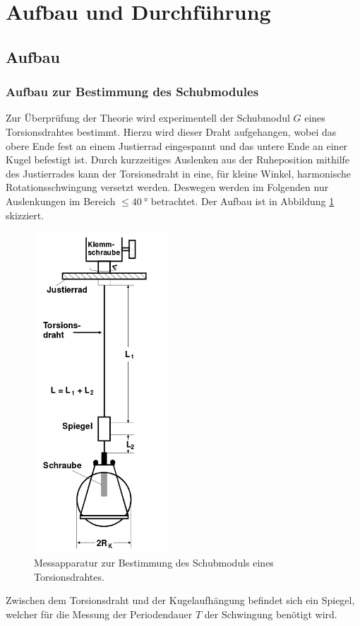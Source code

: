 \section{Aufbau und Durchführung}
\label{sec:Aufbau}
\subsection{Aufbau}
\subsubsection{Aufbau zur Bestimmung des Schubmodules}
Zur Überprüfung der Theorie wird experimentell der Schubmodul $G$  eines Torsionsdrahtes bestimmt.
Hierzu wird dieser Draht aufgehangen, wobei das obere Ende fest an einem Justierrad eingespannt und das untere Ende an einer Kugel befestigt ist.
Durch kurzzeitiges Auslenken aus der Ruheposition mithilfe des Justierrades kann der Torsionsdraht in eine, für kleine Winkel, harmonische Rotationsschwingung versetzt werden.
Deswegen werden im Folgenden nur Auslenkungen im Bereich $\leq \SI{40}{\degree}$ betrachtet.
Der Aufbau ist in Abbildung \ref{fig:d1} skizziert.
\begin{figure}[H]
  \centering
  \includegraphics[height=12cm]{aufbau1.png}
  \caption{Messapparatur zur Bestimmung des Schubmoduls eines Torsionsdrahtes. \cite{sample}}
  \label{fig:d1}
\end{figure}
Zwischen dem Torsionsdraht und der Kugelaufhängung befindet sich ein Spiegel, welcher für die Messung der Periodendauer $T$ der Schwingung benötigt wird.
